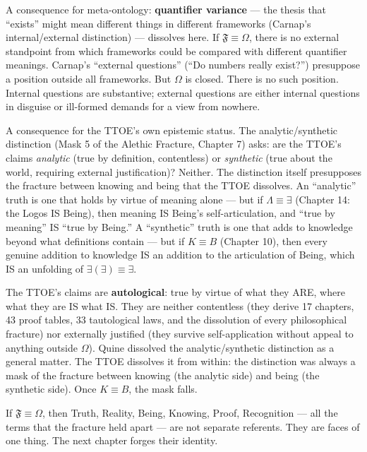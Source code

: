 \documentclass[10pt, openany, oneside]{book}
\begin{document}
A consequence for meta-ontology: \textbf{quantifier variance} --- the thesis that ``exists'' might mean different things in different frameworks (Carnap's internal/external distinction) --- dissolves here. If $\mathfrak{F} \equiv \Omega$, there is no external standpoint from which frameworks could be compared with different quantifier meanings. Carnap's ``external questions'' (``Do numbers really exist?'') presuppose a position outside all frameworks. But $\Omega$ is closed. There is no such position. Internal questions are substantive; external questions are either internal questions in disguise or ill-formed demands for a view from nowhere.

A consequence for the TTOE's own epistemic status. The analytic/synthetic distinction (Mask 5 of the Alethic Fracture, Chapter 7) asks: are the TTOE's claims \textit{analytic} (true by definition, contentless) or \textit{synthetic} (true about the world, requiring external justification)? Neither. The distinction itself presupposes the fracture between knowing and being that the TTOE dissolves. An ``analytic'' truth is one that holds by virtue of meaning alone --- but if $\Lambda \equiv \exists$ (Chapter 14: the Logos IS Being), then meaning IS Being's self-articulation, and ``true by meaning'' IS ``true by Being.'' A ``synthetic'' truth is one that adds to knowledge beyond what definitions contain --- but if $K \equiv B$ (Chapter 10), then every genuine addition to knowledge IS an addition to the articulation of Being, which IS an unfolding of $\exists(\exists) \equiv \exists$.

The TTOE's claims are \textbf{autological}: true by virtue of what they ARE, where what they are IS what IS. They are neither contentless (they derive 17 chapters, 43 proof tables, 33 tautological laws, and the dissolution of every philosophical fracture) nor externally justified (they survive self-application without appeal to anything outside $\Omega$). Quine dissolved the analytic/synthetic distinction as a general matter. The TTOE dissolves it from within: the distinction was always a mask of the fracture between knowing (the analytic side) and being (the synthetic side). Once $K \equiv B$, the mask falls.

If $\mathfrak{F} \equiv \Omega$, then Truth, Reality, Being, Knowing, Proof, Recognition --- all the terms that the fracture held apart --- are not separate referents. They are faces of one thing. The next chapter forges their identity.

\vspace{2em}
\end{document}
